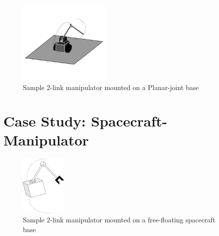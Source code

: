 \documentclass[lettersize,journal]{IEEEtran}
\begin{document}
\begin{figure}
    \centering
    \includegraphics[width=0.4\textwidth]{vehicle-manipulator.jpg}
    \caption{Sample 2-link manipulator mounted on a Planar-joint base}
    \label{fig:planar}
\end{figure}

\section{Case Study: Spacecraft-Manipulator}

\begin{figure}
    \centering
    \includegraphics[width=0.2\textwidth]{Untitled Diagram(2).jpg}
    \caption{Sample 2-link manipulator mounted on a free-floating spacecraft base}
    \label{fig:my_label}
\end{figure}
\end{document}
